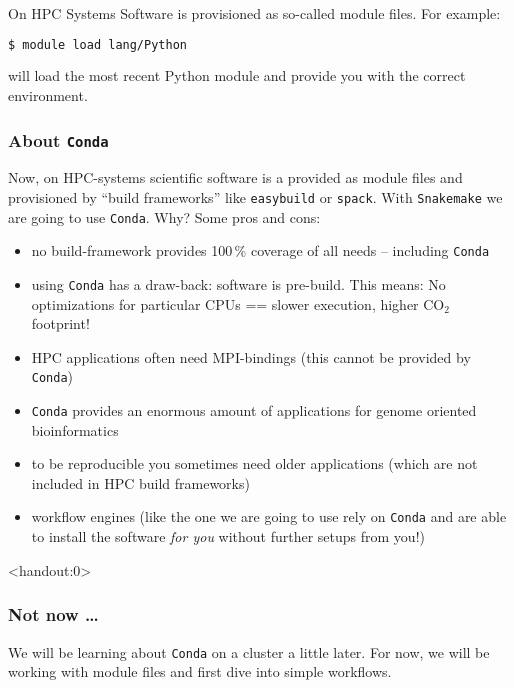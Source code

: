 \begin{frame}[fragile]
  \frametitle{}
  On HPC Systems Software is provisioned as so-called module files. For example:
  \begin{lstlisting}[language=Bash, style=Shell]
$ module load lang/Python
  \end{lstlisting}
  will load the most recent Python module and provide you with the correct environment.
\end{frame}

\begin{frame}[fragile]
  \frametitle{About \texttt{Conda}}
  Now, on HPC-systems scientific software is a provided as module files and provisioned by ``build frameworks'' like \texttt{easybuild} or \texttt{spack}. With \texttt{Snakemake} we are going to use \texttt{Conda}. Why? Some pros and cons:\footnotesize
  \begin{itemize}[<+->]
   \item no build-framework provides 100\,\% coverage of all needs -- including \texttt{Conda}
   \item using \texttt{Conda} has a draw-back: software is pre-build. This means: No optimizations for particular CPUs == slower execution, higher CO$_2$ footprint!
   \item HPC applications often need MPI-bindings (this cannot be provided by \texttt{Conda})
   \item \texttt{Conda} provides an enormous amount of applications for genome oriented bioinformatics
   \item to be reproducible you sometimes need older applications (which are not included in HPC build frameworks)
   \item workflow engines (like the one we are going to use rely on \texttt{Conda} and are able to install the software \emph{for you} without further setups from you!)
  \end{itemize}
  \pause
\end{frame}

\begin{frame}<handout:0>
  \frametitle{Not now \ldots}
  We will be learning about \texttt{Conda} on a cluster a little later. For now, we will be working with module files and first dive into simple workflows.
\end{frame}

